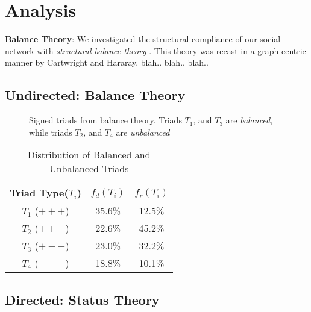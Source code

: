 \section{Analysis}
\textbf{Balance Theory}: 
We investigated the structural compliance of our social network with \textit{structural balance theory} \cite{heider1946attitudes}. 
This theory was recast in a graph-centric manner by Cartwright and Hararay\cite{cartwright1956structural}. 
blah.. blah.. blah..
\subsection{Undirected: Balance Theory}
\begin{figure}
\centering
{}
\quad
{}

\quad
{}
\caption{Signed triads from balance theory. Triads $T_1$, and $T_3$ are \textit{balanced}, while triads $T_2$, and $T_4$ are \textit{unbalanced}}
\label{fig:balanceT}
\end{figure}

\begin{table}
\centering
\caption{Distribution of Balanced and Unbalanced Triads}
\begin{tabular}{| c | c | c |}
\hline
\textbf{Triad Type($T_i$)} & \textbf{$f_d(T_i)$} & \textbf{$f_r(T_i)$} \\
\hline
$T_1$ ($+++$) & 35.6\% & 12.5\%\\
\hline
$T_2$ ($++-$) & 22.6\% & 45.2\%\\
\hline
$T_3$ ($+--$) & 23.0\% & 32.2\%\\
\hline
$T_4$ ($---$)& 18.8\% & 10.1\%\\
\hline
\end{tabular}
\label{table:balanceTDist}
\end{table}

\subsection{Directed: Status Theory}